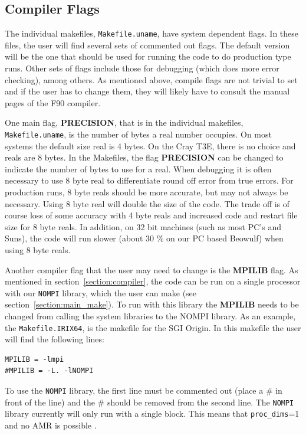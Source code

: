 \subsection{Compiler Flags \label{section:compiler_flags}} 

The individual makefiles, {\tt Makefile.uname}, have system dependent flags.
In these files, the user will find several sets of commented out flags.
The default version will be the one that should be used for running 
the code to do production type runs.  Other sets of flags include
those for debugging (which does more error checking), among others.
As mentioned above, compile flags are not trivial to set and if the user 
has to change them, they will
likely have to consult the manual pages of the F90 compiler.

One main flag, {\bf PRECISION},  that is in the individual 
makefiles, {\tt Makefile.uname},
is the number of bytes a real number occupies.  
On most systems the default size real is 4 bytes.  
On the Cray T3E, there is no choice and reals are 8 bytes. 
In the Makefiles, the flag {\bf PRECISION} can be changed to
indicate the number of bytes to use for a real.
When debugging it is often necessary to use 8 byte real to differentiate
round off error from true errors.  For production runs, 8 byte reals should
be more accurate, but may not always be necessary. 
Using 8 byte real will double the size of the code.
The trade off is of course loss of some accuracy with 4 byte reals
and increased code and restart file size for 8 byte reals.
In addition, on 32 bit machines (such as most PC's and Suns), the code
will run slower (about 30 \% on our PC based Beowulf) when using 8 byte reals.

Another compiler flag that the user may need to change is the {\bf MPILIB}
flag.  As mentioned in section~\ref{section:compiler}, the code can be
run on a single processor with our {\tt NOMPI} library, which the user
can make (see section~\ref{section:main_make}).  To run with this library the
{\bf MPILIB} needs to be changed from calling the system libraries to 
the NOMPI library.  As an example, the {\tt Makefile.IRIX64}, is the makefile
for the SGI Origin.  In this makefile the user will find the following lines:
\begin{verbatim}
MPILIB = -lmpi
#MPILIB = -L. -lNOMPI
\end{verbatim}
To use the {\tt NOMPI} library, the first line must be commented out (place a 
\# in front of the line) and the \# should be removed from the second line.
The {\tt NOMPI} library currently will only run with a single block.  This
means that {\tt proc\_dims}=1 and no AMR is possible
.
